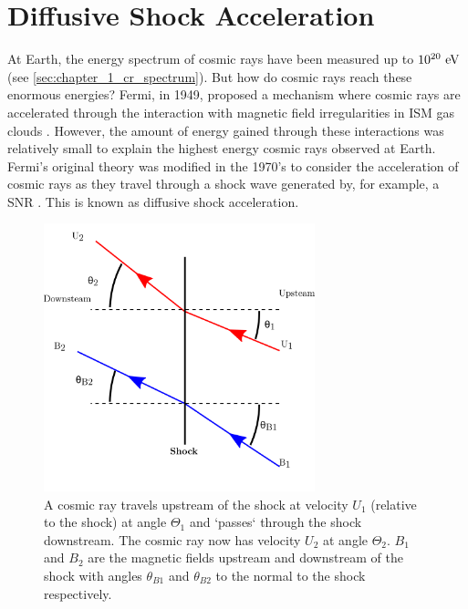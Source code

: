 \chapter{Diffusive Shock Acceleration} \label{A3_DSA}

At Earth, the energy spectrum of cosmic rays have been measured up to $10^{20}~\si{\electronvolt}$ (see \autoref{sec:chapter_1_cr_spectrum}). But how do cosmic rays reach these enormous energies? Fermi, in 1949, proposed a mechanism where cosmic rays are accelerated through the interaction with magnetic field irregularities in ISM gas clouds \citep{1949PhRv...75.1169F}. However, the amount of energy gained through these interactions was relatively small to explain the highest energy cosmic rays observed at Earth. Fermi's original theory was modified in the 1970's to consider the acceleration of cosmic rays as they travel through a shock wave generated by, for example, a SNR \citep{1977DoSSR.234.1306K,1977ICRC...11..132A,1978MNRAS.182..147B,1978MNRAS.182..443B,1978ApJ...221L..29B}. This is known as diffusive shock acceleration.

\begin{figure}
	\centering
	\includegraphics[width=0.7\textwidth]{A3_Diffusive_Shock_Acceleration/Images/shock_dynamics.png}
	\caption{A cosmic ray travels upstream of the shock at velocity $U_1$ (relative to the shock) at angle $\Theta_1$ and `passes` through the shock downstream. The cosmic ray now has velocity $U_2$ at angle $\Theta_2$. $B_1$ and $B_2$ are the magnetic fields upstream and downstream of the shock with angles $\theta_{B1}$ and $\theta_{B2}$ to the normal to the shock respectively.}
	\label{fig:A3_shock_dynamics}
\end{figure}

